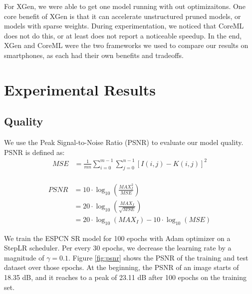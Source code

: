 \documentclass{article}
\begin{document}
For XGen, we were able to get one model running with out optimizaitons. One core benefit of XGen is that it can accelerate unstructured pruned models, or models with sparse weights. During experimentation, we noticed that CoreML does not do this, or at least does not report a noticeable speedup. In the end, XGen and CoreML were the two frameworks we used to compare our results on smartphones, as each had their own benefits and tradeoffs.



\section{Experimental Results}
\subsection{Quality}
We use the Peak Signal-to-Noise Ratio (PSNR) to evaluate our model quality. PSNR is defined as:
\begin{equation}
	\begin{split}
		MSE & = \frac{1}{m n} \sum_{i=0}^{m-1} \sum_{j=0}^{n-1}[I(i, j)-K(i, j)]^2 \\
	\end{split}
\end{equation}


\begin{equation}
	\begin{split}
		PSNR & =10 \cdot \log _{10}\left(\frac{M A X_I^2}{M S E}\right)            \\
		     & =20 \cdot \log _{10}\left(\frac{M A X_I}{\sqrt{M S E}}\right)       \\
		     & =20 \cdot \log _{10}\left(M A X_I\right)-10 \cdot \log _{10}(M S E)
	\end{split}
\end{equation}

We train the ESPCN SR model for 100 epochs with Adam optimizer on a StepLR scheduler. Per every 30 epochs, we decrease the learning rate by a magnitude of $\gamma=0.1$. Figure \ref{fig:psnr} shows the PSNR of the training and test dataset over those epochs. At the beginning, the PSNR of an image starts of 18.35 dB, and it reaches to a peak of 23.11 dB after 100 epochs on the training set.
\end{document}

